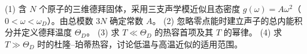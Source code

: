 (1) 含 \(N\) 个原子的三维德拜固体，采用三支声学模近似且态密度 \(g(\omega)=A\omega^2\)（\(0<\omega<\omega_D\)）。由总模数 \(3N\) 确定常数 \(A\)。
(2) 忽略零点能时建立声子的总内能积分并定义德拜温度 \(\Theta_D\)。
(3) 求 \(T\ll\Theta_D\) 的热容首项及其 \(T\) 的幂律。
(4) 求 \(T\gg\Theta_D\) 时的杜隆–珀蒂热容，讨论低温与高温近似的适用范围。
